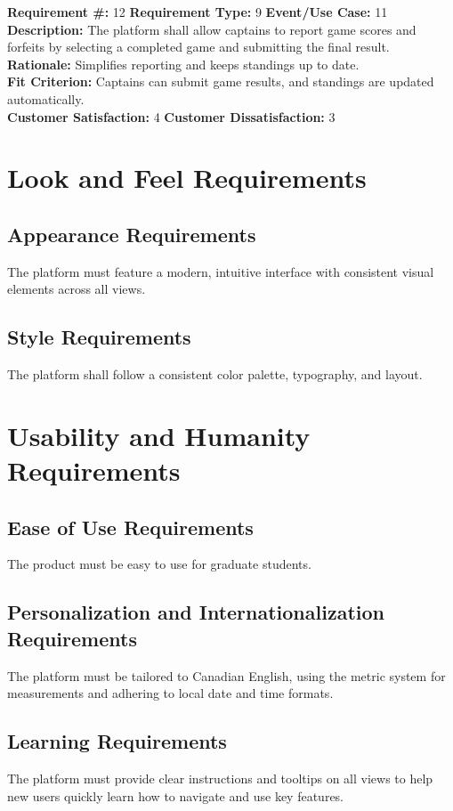\documentclass[12pt]{article}
\begin{document}
\textbf{Requirement \#:} 12 \quad \textbf{Requirement Type:} 9 \quad \textbf{Event/Use Case:} 11 \\
\textbf{Description:} The platform shall allow captains to report game scores and forfeits by selecting a completed game and submitting the final result.\\
\textbf{Rationale:} Simplifies reporting and keeps standings up to date.\\
\textbf{Fit Criterion:} Captains can submit game results, and standings are updated automatically. \\
\textbf{Customer Satisfaction:} 4 \quad\quad \textbf{Customer Dissatisfaction:} 3\\

\section{Look and Feel Requirements}
\subsection{Appearance Requirements}
The platform must feature a modern, intuitive interface with consistent visual elements across all views.

\subsection{Style Requirements}
The platform shall follow a consistent color palette, typography, and layout.

\section{Usability and Humanity Requirements}
\subsection{Ease of Use Requirements}
The product must be easy to use for graduate students.

\subsection{Personalization and Internationalization Requirements}
The platform must be tailored to Canadian English, using the metric system for measurements and adhering to local date and time formats.

\subsection{Learning Requirements}
The platform must provide clear instructions and tooltips on all views to help new users quickly learn how to navigate and use key features.\\
\end{document}

